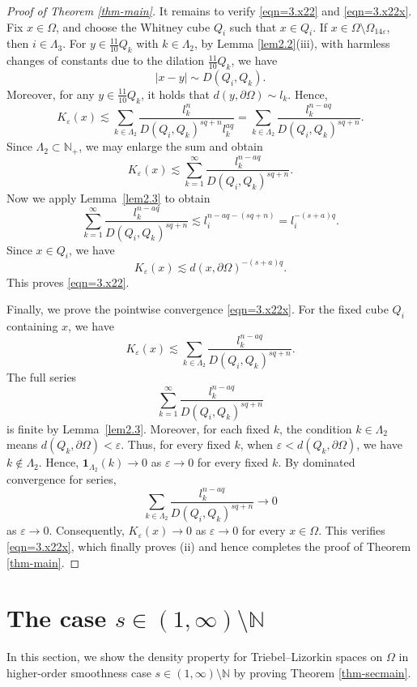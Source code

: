 \documentclass[11pt,twoside]{article}
\def\boz{{\Omega}}
\def\vez{\varepsilon}
\theoremstyle{mylem}
\theoremstyle{definition}
\numberwithin{equation}{section}
\begin{document}
\begin{proof}[Proof of Theorem \ref{thm-main}]
It remains to verify \eqref{eqn=3.x22} and \eqref{eqn=3.x22x}.
Fix $x\in\Omega$, and choose the Whitney cube $Q_i$ such that $x\in Q_i$. 
If $x\in\Omega\setminus\Omega_{14\varepsilon}$, then $i\in\Lambda_3$. For $y\in\frac{11}{10}Q_k$ with $k\in\Lambda_2$, by 
Lemma \ref{lem2.2}(iii), with harmless changes of constants due to the dilation $\frac{11}{10}Q_k$, we have
\[
|x-y|\sim D(Q_i,Q_k).
\]
Moreover, for any $y\in \frac{11}{10}Q_k$, it holds that
$
d(y,\partial\Omega)\sim l_k.
$
Hence,
\[
K_\varepsilon(x)
\lesssim
\sum_{k\in\Lambda_2}
\frac{l_k^n}
{D(Q_i,Q_k)^{sq+n}l_k^{aq}}
=
\sum_{k\in\Lambda_2}
\frac{l_k^{n-aq}}
{D(Q_i,Q_k)^{sq+n}}.
\]
Since $\Lambda_2\subset\mathbb N_+$, we may enlarge the sum and obtain
\[
K_\varepsilon(x)
\lesssim
\sum_{k=1}^\infty
\frac{l_k^{n-aq}}
{D(Q_i,Q_k)^{sq+n}}.
\]
Now we apply Lemma~\ref{lem2.3} to obtain
\[
\sum_{k=1}^\infty
\frac{l_k^{n-aq}}
{D(Q_i,Q_k)^{sq+n}}
\lesssim
l_i^{n-aq-(sq+n)}
=
l_i^{-(s+a)q}.
\]
Since $x\in Q_i$, we have 
\[
K_\varepsilon(x)
\lesssim
d(x,\partial\Omega)^{-(s+a)q}.
\]
This proves \eqref{eqn=3.x22}.

Finally, we prove the pointwise convergence \eqref{eqn=3.x22x}. For the fixed cube $Q_i$ containing $x$, we have
\[
K_\varepsilon(x)
\lesssim
\sum_{k\in\Lambda_2}
\frac{l_k^{n-aq}}
{D(Q_i,Q_k)^{sq+n}}.
\]
The full series
\[
\sum_{k=1}^\infty
\frac{l_k^{n-aq}}
{D(Q_i,Q_k)^{sq+n}}
\]
is finite by Lemma~\ref{lem2.3}. Moreover, for each fixed $k$, the condition $k\in\Lambda_2$ means
$
d(Q_k,\partial\Omega)<\varepsilon.
$
Thus, for every fixed $k$, when $\varepsilon<d(Q_k,\partial\Omega)$, we have $k\notin\Lambda_2$. Hence,
$
\mathbf{1}_{\Lambda_2}(k)\to0
$
as $\vez\to0$ for every fixed $k$. By dominated convergence for series,
\[
\sum_{k\in\Lambda_2}
\frac{l_k^{n-aq}}
{D(Q_i,Q_k)^{sq+n}}
\to0
\]
as $\vez\to0$. Consequently, $K_\varepsilon(x)\to 0$ as $\vez\to0$
for every $x\in\Omega$.
This verifies \eqref{eqn=3.x22x}, which finally proves (ii)
and hence completes the proof of Theorem \ref{thm-main}.
\end{proof}

\section{The case $s\in(1,\infty)\setminus\mathbb{N}$}\label{s4}

In this section, we show the density property for Triebel--Lizorkin 
spaces on $\boz$ in higher-order smoothness 
case $s\in(1,\infty)\setminus\mathbb{N}$ by proving Theorem \ref{thm-secmain}.
\end{document}
